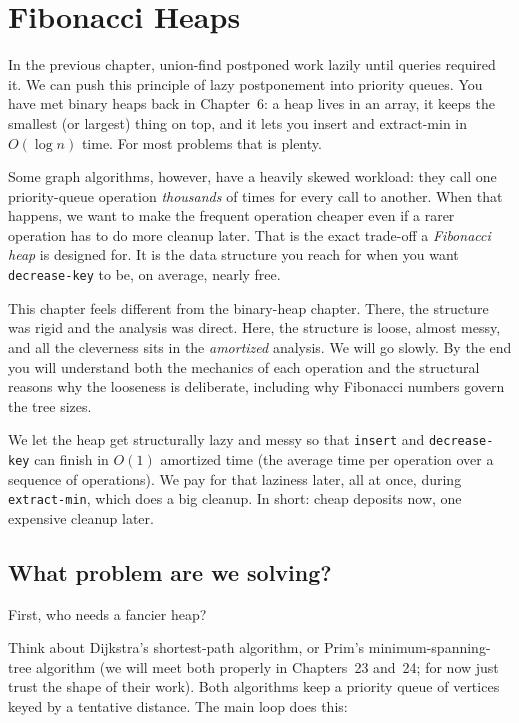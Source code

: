 \chapter{Fibonacci Heaps}

In the previous chapter, union-find postponed work lazily until queries required it. We can push this principle of lazy postponement into priority queues. You have met binary heaps back in Chapter~6: a heap lives in
an array, it keeps the smallest (or largest) thing on top, and it lets you insert
and extract-min in $O(\log n)$ time. For most problems that is plenty.

Some graph algorithms, however, have a heavily skewed workload: they call
one priority-queue operation \emph{thousands} of times for every call to another.
When that happens, we want to make the frequent operation cheaper even if a rarer
operation has to do more cleanup later. That is the exact trade-off a \emph{Fibonacci heap}
is designed for. It is the data structure you reach
for when you want \lstinline|decrease-key| to be, on average, nearly free.

This chapter feels different from the binary-heap chapter. There, the
structure was rigid and the analysis was direct. Here, the structure is loose,
almost messy, and all the cleverness sits in the \emph{amortized} analysis. We
will go slowly. By the end you will understand both the mechanics of each operation
and the structural reasons why the looseness is deliberate, including why Fibonacci
numbers govern the tree sizes.

\begin{focusbox}
We let the heap get structurally lazy and messy
so that \lstinline|insert| and \lstinline|decrease-key| can finish in $O(1)$
amortized time (the average time per operation over a sequence of operations). We pay for that laziness later, all at once, during
\lstinline|extract-min|, which does a big cleanup. In short: cheap deposits now,
one expensive cleanup later.
\end{focusbox}

\section{What problem are we solving?}
\label{ch20:problem}

First, who needs a fancier heap?

Think about Dijkstra's shortest-path algorithm, or Prim's minimum-spanning-tree algorithm (we will meet both properly in Chapters~23 and~24; for now just trust the shape of their work). Both algorithms keep a priority queue of vertices keyed by a tentative distance. The main loop does this:

